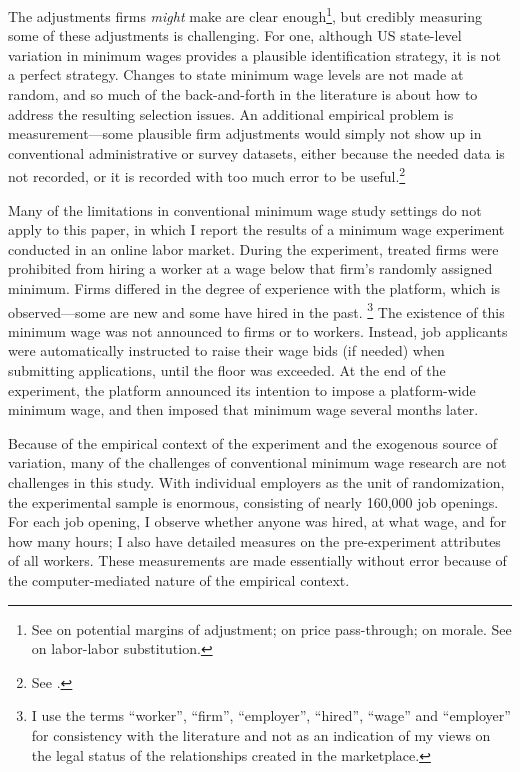 \documentclass[AER]{AEA}
\begin{document}
The adjustments firms \emph{might} make are clear enough\footnote{
  See \cite{schmitt2013does} on potential margins of adjustment; \cite{draca2011minimum} on price pass-through; \cite{hirsch2011minimum} on morale. See \cite{fairris2008, giuliano2009minimum} on labor-labor substitution.
}, but credibly measuring some of these adjustments is challenging. 
For one, although US state-level variation in minimum wages provides a plausible identification strategy, it is not a perfect strategy. 
Changes to state minimum wage levels are not made at random, and so much of the back-and-forth in the literature is about how to address the resulting selection issues.
An additional empirical problem is measurement---some plausible firm adjustments would simply not show up in conventional administrative or survey datasets, either because the needed data is not recorded, or it is recorded with too much error to be useful.\footnote{
  See \cite{card1992using, card1995time, katz1992effect, allegretto2011minimum, dube2010minimum, neumark2013revisiting, clemens2014minimum, powell2016synthetic, meer2013effects}.
}


Many of the limitations in conventional minimum wage study settings do not apply to this paper, in which I report the results of a minimum wage experiment conducted in an online labor market.
During the experiment, treated firms were prohibited from hiring a worker at a wage below that firm's randomly assigned minimum.
Firms differed in the degree of experience with the platform, which is observed---some are new and some have hired in the past. 
\footnote{
  I use the terms ``worker'', ``firm'', ``employer'', ``hired'', ``wage'' and ``employer'' for consistency with the literature and not as an indication of my views on the legal status of the relationships created in the marketplace. 
}  
The existence of this minimum wage was not announced to firms or to workers.
Instead, job applicants were automatically instructed to raise their wage bids (if needed) when submitting applications, until the floor was exceeded.
At the end of the experiment, the platform announced its intention to impose a platform-wide minimum wage, and then imposed that minimum wage several months later.


Because of the empirical context of the experiment and the exogenous source of variation, many of the challenges of conventional minimum wage research are not challenges in this study. 
With individual employers as the unit of randomization, the experimental sample is enormous, consisting of nearly 160,000 job openings.
For each job opening, I observe whether anyone was hired, at what wage, and for how many hours; 
I also have detailed measures on the pre-experiment attributes of all workers. 
These measurements are made essentially without error because of the computer-mediated nature of the empirical context. 
\end{document}
